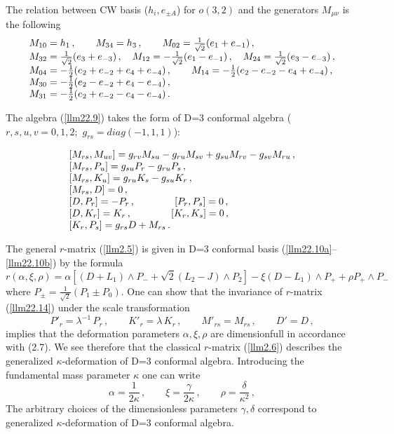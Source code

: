 \documentclass[a4paper,12pt,showkeys]{article}
\begin{document}
The relation between CW basis ($h_i , e_{\pm A}$) for $o(3,2)$
and the generators
 $M_{\mu\nu}$  is the following
 \begin{equation}\label{llm2.11}
 \begin{array}{l}
 M_{10} = h_1 \, , \qquad M_{34} = h_3 \, ,
\qquad
  M_{02} = \frac{1}{\sqrt{2}} (e_1 +e_{-1} ) \, ,
 \cr
 M_{32} = \frac{1}{\sqrt{2}} (e_3 +e_{-3} )\, ,
 \quad
  M_{12} = -\frac{1}{\sqrt{2}} (e_1 -e_{-1} ) \, ,
  \quad
   M_{24} = \frac{1}{\sqrt{2}} (e_3 - e_{-3} )\, ,
   \cr
    M_{04} = -\frac{1}{{2}} (e_2 + e_{-2}  + e_4 + e_{-4} )\, ,
\qquad
 M_{14} = -\frac{1}{{2}} (e_2 -  e_{-2}  - e_4 + e_{-4} )\, ,
 \cr
 M_{30} = -\frac{1}{{2}} (e_2 -  e_{-2}  + e_4 - e_{-4} )\, ,
\cr
 M_{31} = -\frac{1}{{2}} (e_2 +  e_{-2}  - e_4 - e_{-4} )\, .
 \end{array}
 \end{equation}


The algebra (\ref{llm22.9}) takes the  form of
D=3 conformal algebra
 ($r,s,u,v=0, 1,2;$ $ g_{rs} = diag (-1,1,1)$):


\begin{equation}
 \begin{array}{l}
[M_{rs}, M_{u v}]  =
 g_{rv} M_{su} -
 g_{ru} M_{sv} + g_{su} M_{rv} - g_{sv}M_{ru}\, ,
\cr
 [M_{rs}, P_{u} ]  =
g_{su}P_r-g_{ru}P_s\, ,
 \cr
[M_{rs}, K_{u} ]  =  g_{ru}K_s-g_{su}K_r\, ,
\cr
[M_{rs} , D] = 0 \, ,
\cr
[D, P_r ]  = - P_r\, , \qquad  \qquad [P_r, P_s ]  = 0 \, ,
\cr
[D, K_r ] =  K_r\, ,  \qquad \qquad [K_r, K_s ] = 0 \, ,
\cr
[K_r, P_s ] =   g_{rs} D + M_{rs} \, .
 \end{array}
\end{equation}

The general $r$-matrix (\ref{llm2.5}) is given in D=3 conformal basis
(\ref{llm22.10a}--\ref{llm22.10b}) by
the formula
\begin{equation}\label{llm22.14}
  r(\alpha, \xi, \rho) = { \alpha}
   [(D+L_1 ) \wedge P_- +
 {\sqrt{2}} (L_2 -J )\wedge P_2]
   - \xi(D- L_1)\wedge P_+ + \rho P_+ \wedge P_-
\end{equation}
where $P_{\pm} = \frac{1}{\sqrt{2}}(P_1 \pm P_0)$.
One can show that the invariance of $r$-matrix (\ref{llm22.14}) under the scale
transformation
\begin{equation}
\label{lulymo3.7}
  P'_r = \lambda^{-1} \, P_r \, , \qquad
  K'_r = \lambda \, K_r \, , \qquad
  M'_{rs} = M_{rs} \, , \qquad D' = D\, ,
\end{equation}
implies that the deformation parameters $\alpha ,\xi, \rho$
  are dimensionfull in accordance with (2.7).
 We see therefore that the
  classical $r$-matrix (\ref{llm2.6}) describes the generalized
    $\kappa$-deformation of D=3 conformal algebra. Introducing the fundamental
    mass parameter  $\kappa$ one can write
\begin{equation}\label{lulymo3.8}
  \alpha = \frac{1}{2\kappa} \, , \qquad
  \xi = \frac{\gamma}{2\kappa} \, , \qquad
  \rho = \frac{\delta}{\kappa^2} \, ,
\end{equation}
The arbitrary choices of the dimensionless parameters $\gamma, \delta$
correspond to generalized
 $\kappa$-deformation of D=3 conformal algebra.
\end{document}
